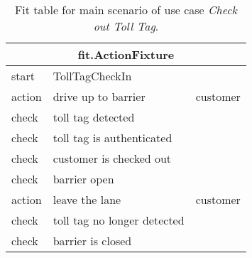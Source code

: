 \begin{table}[H]
\begin{centering}
\begin{tabular}{|l|l|l|}
\hline \multicolumn{3}{|c|}{fit.ActionFixture}\tabularnewline
\hline start & \multicolumn{1}{l}{TollTagCheckIn} & \tabularnewline
\hline action & drive up to barrier & customer \tabularnewline
\hline check & \multicolumn{1}{l}{toll tag detected} &\tabularnewline
\hline check & \multicolumn{1}{l}{toll tag is authenticated} & \tabularnewline
\hline check & \multicolumn{1}{l}{customer is checked out} & \tabularnewline
\hline check & \multicolumn{1}{l}{barrier open} & \tabularnewline
\hline action & leave the lane & customer \tabularnewline
\hline check & \multicolumn{1}{l}{toll tag no longer detected} & \tabularnewline
\hline check & \multicolumn{1}{l}{barrier is closed} & \tabularnewline
\hline 
\end{tabular}
\end{centering}
\caption{Fit table for main scenario of use case \emph{Check out Toll Tag}.}
\end{table}
